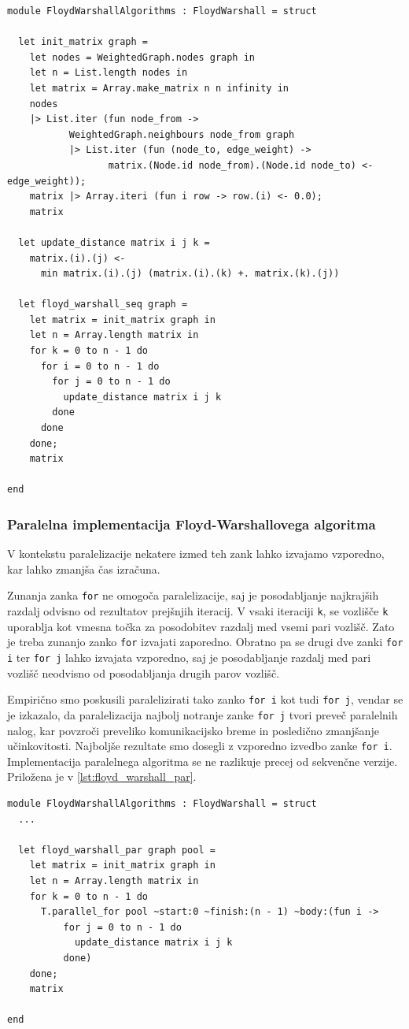 \documentclass[mat1, tisk]{fmfdelo}
\begin{document}
\begin{lstlisting}[label=lst:floyd_warshall_seq]
module FloydWarshallAlgorithms : FloydWarshall = struct

  let init_matrix graph =
    let nodes = WeightedGraph.nodes graph in
    let n = List.length nodes in
    let matrix = Array.make_matrix n n infinity in
    nodes
    |> List.iter (fun node_from ->
           WeightedGraph.neighbours node_from graph
           |> List.iter (fun (node_to, edge_weight) ->
                  matrix.(Node.id node_from).(Node.id node_to) <- edge_weight));
    matrix |> Array.iteri (fun i row -> row.(i) <- 0.0);
    matrix
  
  let update_distance matrix i j k =
    matrix.(i).(j) <- 
      min matrix.(i).(j) (matrix.(i).(k) +. matrix.(k).(j))

  let floyd_warshall_seq graph =
    let matrix = init_matrix graph in
    let n = Array.length matrix in
    for k = 0 to n - 1 do
      for i = 0 to n - 1 do
        for j = 0 to n - 1 do
          update_distance matrix i j k
        done
      done
    done;
    matrix

end
\end{lstlisting}


\subsubsection{Paralelna implementacija Floyd-Warshallovega algoritma}

V kontekstu paralelizacije nekatere izmed teh zank lahko izvajamo vzporedno, kar lahko zmanjša čas izračuna.

Zunanja zanka \texttt{for} ne omogoča paralelizacije, saj je posodabljanje najkrajših razdalj odvisno od rezultatov
prejšnjih iteracij. V vsaki iteraciji \texttt{k}, se vozlišče \texttt{k} uporablja kot vmesna točka za posodobitev
razdalj med vsemi pari vozlišč. Zato je treba zunanjo zanko \texttt{for} izvajati zaporedno.
Obratno pa se drugi dve zanki \texttt{for i} ter \texttt{for j} lahko izvajata vzporedno, saj je posodabljanje razdalj med pari vozlišč
neodvisno od posodabljanja drugih parov vozlišč.

Empirično smo poskusili paralelizirati tako zanko \texttt{for i} kot tudi \texttt{for j}, vendar se je izkazalo, da paralelizacija najbolj
notranje zanke \texttt{for j} tvori preveč paralelnih nalog, kar povzroči preveliko komunikacijsko breme in posledično
zmanjšanje učinkovitosti. Najboljše rezultate smo dosegli z vzporedno izvedbo zanke \texttt{for i}.
Implementacija paralelnega algoritma se ne razlikuje precej od sekvenčne verzije. Priložena je v \ref{lst:floyd_warshall_par}.

\begin{lstlisting}[label=lst:floyd_warshall_par]
module FloydWarshallAlgorithms : FloydWarshall = struct
  ...

  let floyd_warshall_par graph pool =
    let matrix = init_matrix graph in
    let n = Array.length matrix in
    for k = 0 to n - 1 do
      T.parallel_for pool ~start:0 ~finish:(n - 1) ~body:(fun i ->
          for j = 0 to n - 1 do
            update_distance matrix i j k
          done)
    done;
    matrix

end
\end{lstlisting}
\end{document}
